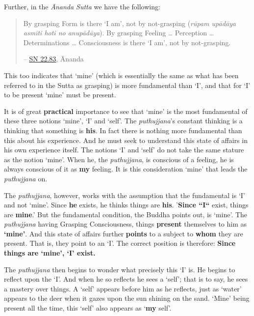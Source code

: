 Further, in the \emph{Ānanda Sutta} we have the following:

\begin{quote}
By grasping Form is there `I am', not by not-grasping (\emph{rūpam upādāya asmīti hoti no anupādāya}). By grasping Feeling \ldots{} Perception \ldots{} Determinations \ldots{} Consciousness is there `I am', not by not-grasping.

 -- \href{https://suttacentral.net/sn22.83/en/bodhi}{SN 22.83}, Ānanda
\end{quote}

This too indicates that `mine' (which is essentially the same as what has been referred to in the Sutta as grasping) is more fundamental than `I', and that for `I' to be present `mine' must be present.

It is of great \textbf{practical} importance to see that `mine' is the most fundamental of these three notions `mine', `I' and `self'. The \emph{puthujjana}'s constant thinking is a thinking that something is \textbf{his}. In fact there is nothing more fundamental than this about his experience. And he must seek to understand this state of affairs in his own experience itself. The notions `I' and `self' do not take the same stature as the notion `mine'. When he, the \emph{puthujjana}, is conscious of a feeling, he is always conscious of it as \textbf{my} feeling. It is this consideration `mine' that leads the \emph{puthujjana} on.

The \emph{puthujjana}, however, works with the assumption that the fundamental is `I' and not `mine'. Since \textbf{he} exists, he thinks things are \textbf{his}. '\textbf{Since ``I``} exist, things are \textbf{mine}.' But the fundamental condition, the Buddha points out, is `mine'. The \emph{puthujjana} having Grasping Consciousness, things \textbf{present} themselves to him as \textbf{`mine'}. And this state of affairs further \textbf{points} to a subject to \textbf{whom} they are present. That is, they point to an `I'. The correct position is therefore: \textbf{Since things are `mine', `I' exist.}

The \emph{puthujjana} then begins to wonder what precisely this `I' is. He begins to reflect upon the `I'. And when he so reflects he sees a `self'; that is to say, he sees a mastery over things. A `self' appears before him as he reflects, just as `water' appears to the deer when it gazes upon the sun shining on the sand. `Mine' being present all the time, this `self' also appears as `\textbf{my} self'.

